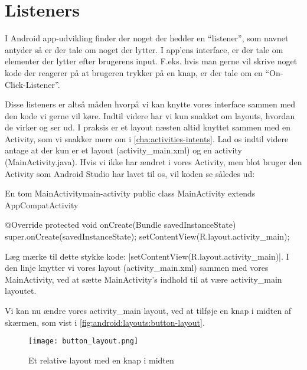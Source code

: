\cleardoublepage

\section{Listeners}
I Android app-udvikling finder der noget der hedder en ``listener'', som navnet 
antyder så er der tale om noget der lytter. I app'ens \gls{interface}, er der 
tale om elementer der lytter efter brugerens input. F.eks. hvis man gerne vil 
skrive noget kode der reagerer på at brugeren trykker på en knap, er der tale 
om en ``On-Click-Listener''.

Disse listeners er altså måden hvorpå vi kan knytte vores \gls{interface} 
sammen med den kode vi gerne vil køre. Indtil videre har vi kun snakket om 
layouts, hvordan de virker og ser ud. I praksis er et layout næsten altid 
knyttet sammen med en Activity, som vi snakker mere om i 
\autoref{cha:activities-intents}. Lad os indtil videre antage at der kun er et 
layout (activity\_main.xml) og en activity (MainActivity.java). Hvis vi ikke 
har ændret i vores Activity, men blot bruger den Activity som Android Studio 
har lavet til os, vil koden se således ud:

\begin{JavaCode}{En tom MainActivity}{main-activity}
	public class MainActivity extends AppCompatActivity {
		
		@Override
		protected void onCreate(Bundle savedInstanceState) {
			super.onCreate(savedInstanceState);
			setContentView(R.layout.activity_main);
		}
	
	}
\end{JavaCode}

Læg mærke til dette stykke kode: 
\JavaInline|setContentView(R.layout.activity_main)|. I den linje knytter vi 
vores layout (activity\_main.xml) sammen med vores MainActivity, ved at sætte 
MainActivity's indhold til at være activity\_main layoutet.

Vi kan nu ændre vores activity\_main layout, ved at tilføje en knap i midten af 
skærmen, som vist i \autoref{fig:android:layouts:button-layout}.

\begin{figure}[h]
	\begin{center}
		\texttt{[image: button\_layout.png]}
		\caption{Et relative layout med en knap i midten}
		\label{fig:android:layouts:button-layout}
	\end{center}
\end{figure}

